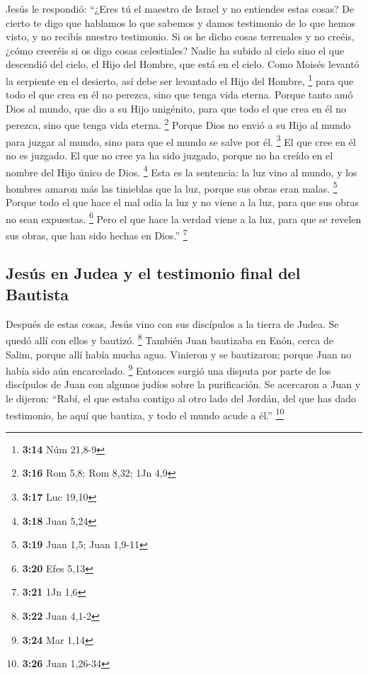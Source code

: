 \begin{paracol}{2}
 Jesús le respondió: ``¿Eres tú el maestro de Israel y no
entiendes estas cosas?  De cierto te digo que hablamos lo
que sabemos y damos testimonio de lo que hemos visto, y no recibís
nuestro testimonio.  Si os he dicho cosas terrenales y no
creéis, ¿cómo creeréis si os digo cosas celestiales? 
Nadie ha subido al cielo sino el que descendió del cielo, el Hijo del
Hombre, que está en el cielo.  Como Moisés levantó la
serpiente en el desierto, así debe ser levantado el Hijo del Hombre,
\footnote{\textbf{3:14} Núm 21,8-9}  para que todo el que
crea en él no perezca, sino que tenga vida eterna. 
Porque tanto amó Dios al mundo, que dio a su Hijo unigénito, para que
todo el que crea en él no perezca, sino que tenga vida eterna.
\footnote{\textbf{3:16} Rom 5,8; Rom 8,32; 1Jn 4,9} 
Porque Dios no envió a su Hijo al mundo para juzgar al mundo, sino para
que el mundo se salve por él. \footnote{\textbf{3:17} Luc 19,10}
 El que cree en él no es juzgado. El que no cree ya ha
sido juzgado, porque no ha creído en el nombre del Hijo único de Dios.
\footnote{\textbf{3:18} Juan 5,24}  Esta es la sentencia:
la luz vino al mundo, y los hombres amaron más las tinieblas que la luz,
porque sus obras eran malas. \footnote{\textbf{3:19} Juan 1,5; Juan
  1,9-11}  Porque todo el que hace el mal odia la luz y
no viene a la luz, para que sus obras no sean expuestas. \footnote{\textbf{3:20}
  Efes 5,13}  Pero el que hace la verdad viene a la luz,
para que se revelen sus obras, que han sido hechas en Dios.''
\footnote{\textbf{3:21} 1Jn 1,6}

\hypertarget{jesuxfas-en-judea-y-el-testimonio-final-del-bautista}{%
\subsection{Jesús en Judea y el testimonio final del
Bautista}\label{jesuxfas-en-judea-y-el-testimonio-final-del-bautista}}

 Después de estas cosas, Jesús vino con sus discípulos a
la tierra de Judea. Se quedó allí con ellos y bautizó. \footnote{\textbf{3:22}
  Juan 4,1-2}  También Juan bautizaba en Enón, cerca de
Salim, porque allí había mucha agua. Vinieron y se bautizaron;
 porque Juan no había sido aún encarcelado. \footnote{\textbf{3:24}
  Mar 1,14}  Entonces surgió una disputa por parte de los
discípulos de Juan con algunos judíos sobre la purificación.
 Se acercaron a Juan y le dijeron: ``Rabí, el que estaba
contigo al otro lado del Jordán, del que has dado testimonio, he aquí
que bautiza, y todo el mundo acude a él.'' \footnote{\textbf{3:26} Juan
  1,26-34}


\end{paracol}

